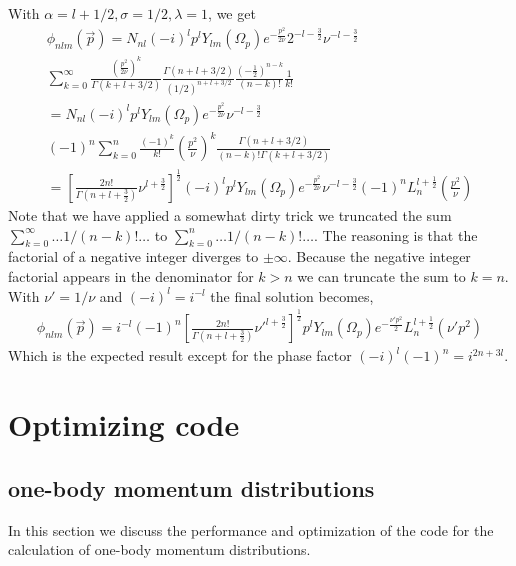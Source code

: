 \documentclass[10pt]{article}
\begin{document}
With $\alpha = l+1/2, \sigma = 1/2, \lambda = 1$, we get
\begin{multline*}
	\phi_{n l m}(\vec{p}) = N_{nl} (-i)^{l} p^{l}  Y_{l m}(\Omega_p) e^{-\frac{p^{2}}{2 \nu}} 2^{-l-\frac{3}{2}} \nu^{-l-\frac{3}{2}} \\
	 \sum_{k=0}^{\infty}  \frac{\left( \frac{p^{2}}{2 \nu} \right)^{k}}{\Gamma(k+l+3/2)} \frac{\Gamma(n+l+3/2)}{(1/2)^{n+l+3/2}} \frac{\left(-\frac{1}{2}\right)^{n-k}}{(n-k)!} \frac{1}{k!} \\
	 = N_{nl} (-i)^{l} p^{l}  Y_{l m}(\Omega_p) e^{-\frac{p^{2}}{2 \nu}} \nu^{-l-\frac{3}{2}} \\
	 (-1)^{n} \sum_{k=0}^{n} \frac{(-1)^{k}}{k!} \left( \frac{p^{2}}{\nu} \right)^{k} \frac{\Gamma(n+l+3/2)}{(n-k)! \Gamma(k+l+3/2)} \\
	 = \left[ \frac{ 2n!}{\Gamma(n+l+\frac{3}{2})} \nu^{l+\frac{3}{2}} \right]^{\frac{1}{2}} (-i)^{l} p^{l}  Y_{l m}(\Omega_p) e^{-\frac{p^{2}}{2 \nu}} \nu^{-l-\frac{3}{2}} (-1)^{n} L_{n}^{l+\frac{1}{2}}(\frac{p^{2}}{\nu})
\end{multline*}
Note that we have applied a somewhat dirty trick we truncated the sum $\sum_{k=0}^{\infty} \ldots 1/(n-k)! \ldots$ to $ \sum_{k=0}^{n} \ldots 1/(n-k)! \ldots$. The reasoning is that the factorial of a negative integer diverges to $\pm \infty$. Because the negative integer factorial appears in the denominator for $k>n$ we can truncate the sum to $k=n$. With $\nu' = 1/\nu$ and $(-i)^{l}=i^{-l}$ the final solution becomes,
\begin{align*}
	\phi_{n l m}(\vec{p}) =  i^{-l} (-1)^{n} \left[ \frac{ 2n!}{\Gamma(n+l+\frac{3}{2})} \nu'^{l+\frac{3}{2}} \right]^{\frac{1}{2}} p^{l}  Y_{l m}(\Omega_p) e^{-\frac{\nu' p^{2}}{2}} L_{n}^{l+\frac{1}{2}}(\nu'p^{2})
\end{align*}
Which is the expected result except for the phase factor $(-i)^{l} (-1)^{n} = i^{2n+3l}$.



\section{Optimizing code}

\subsection{one-body momentum distributions}
In this section we discuss the performance and optimization of the code for the calculation of one-body momentum distributions.
\end{document}
